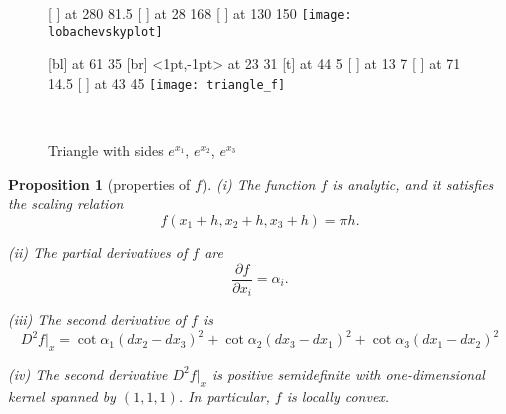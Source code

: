 \documentclass[a4paper, 11pt]{article}
\newcommand{\Z}{\mathbb{Z}}
\newcommand{\lob}{\mbox{\fontencoding{OT2}\fontfamily{wncyr}\fontseries{m}\fontshape{n}\selectfont L}}
\theoremstyle{plain}
\newtheorem{proposition}[theorem]{Proposition}
\theoremstyle{definition}
\begin{document}
\begin{figure}
  \begin{minipage}[c]{0.6\linewidth}
    \small\hair 2pt
    \pinlabel {$\alpha$} [ ] at 280 81.5
     [ ] at 28 168
    \pinlabel {$y=\lob(\alpha)$} [ ] at 130 150
    \endlabellist
    \centering
    \texttt{[image: lobachevskyplot]}
  \end{minipage}
  \hfill
  \begin{minipage}[c]{0.35\linewidth}
    \small\hair 2pt
     [bl] at 61 35
     [br] <1pt,-1pt> at 23 31
     [t] at 44 5
     [ ] at 13 7
     [ ] at 71 14.5
     [ ] at 43 45
    \endlabellist
    \centering
    \texttt{[image: triangle\_f]}
  \end{minipage}\\
  \begin{minipage}[t]{0.6\linewidth}
    \caption{Milnor's Lobachevsky function $\lob$ is $\pi$-periodic,
      odd, and analytic except at $\alpha\in\pi\,\Z$, where the
      derivative tends to $+\infty$.}
    \label{fig:lobachevskyplot}
  \end{minipage}
  \hfill
  \begin{minipage}[t]{0.35\linewidth}
    \caption{Triangle with sides $e^{x_{1}}$, $e^{x_{2}}$, $e^{x_{3}}$}
    \label{fig:triangle_f}    
  \end{minipage}
\end{figure}

\begin{proposition}[properties of $f$]
  \label{prop:f}
  (i) The function $f$ is analytic, and it satisfies the \emph{scaling
    relation}
  \begin{equation}
    \label{eq:fscale}
    f(x_{1}+h,x_{2}+h,x_{3}+h)=\pi h.
  \end{equation}
  
  (ii) The partial derivatives of $f$ are
  \begin{equation}
    \label{eq:df}
    \frac{\partial f}{\partial x_{i}}=\alpha_{i}.
  \end{equation}

  (iii) The second derivative of $f$ is 
  \begin{equation}
    \label{eq:d2f}
    D^{2}f|_{x}=\cot\alpha_{1}(dx_{2}-dx_{3})^{2}+\cot\alpha_{2}(dx_{3}-dx_{1})^{2}
    +\cot\alpha_{3}(dx_{1}-dx_{2})^{2}
  \end{equation}
  
  (iv) The second derivative $D^{2}f|_{x}$ is positive semidefinite
  with one-dimensional kernel spanned by $(1,1,1)$. In particular, $f$
  is locally convex.
\end{proposition}
\end{document}
